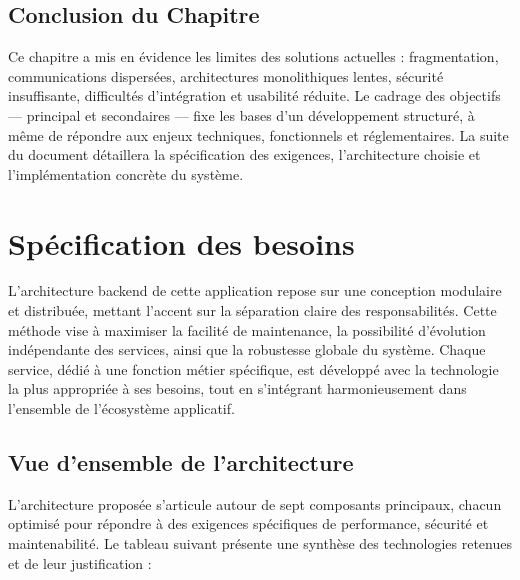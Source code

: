 \documentclass[12pt]{rapportPfe}
\begin{document}
\section{Conclusion du Chapitre}
Ce chapitre a mis en évidence les limites des solutions actuelles : fragmentation, communications dispersées, architectures monolithiques lentes, sécurité insuffisante, difficultés d’intégration et usabilité réduite. Le cadrage des objectifs — principal et secondaires — fixe les bases d’un développement structuré, à même de répondre aux enjeux techniques, fonctionnels et réglementaires. La suite du document détaillera la spécification des exigences, l’architecture choisie et l’implémentation concrète du système.



\chapter{Spécification des besoins}

L’architecture backend de cette application repose sur une conception modulaire et distribuée, mettant l’accent sur la séparation claire des responsabilités. Cette méthode vise à maximiser la facilité de maintenance, la possibilité d’évolution indépendante des services, ainsi que la robustesse globale du système. Chaque service, dédié à une fonction métier spécifique, est développé avec la technologie la plus appropriée à ses besoins, tout en s’intégrant harmonieusement dans l’ensemble de l’écosystème applicatif.

\section{Vue d'ensemble de l'architecture}
L'architecture proposée s'articule autour de sept composants principaux, chacun optimisé pour répondre à des exigences spécifiques de performance, sécurité et maintenabilité. Le tableau suivant présente une synthèse des technologies retenues et de leur justification :
\end{document}
